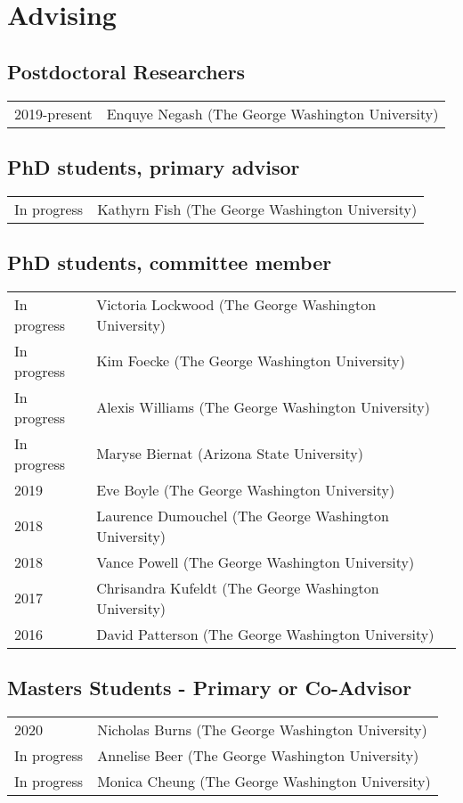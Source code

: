 \documentclass{article}
\begin{document}
\section*{Advising}
\subsection*{Postdoctoral Researchers}
\begin{tabular}{p{}p{}}
2019-present & Enquye Negash (The George Washington University)\\[4pt]
\end{tabular}

\subsection*{PhD students, primary advisor}
\begin{tabular}{p{}p{}}
In progress & Kathyrn Fish (The George Washington University)\\[4pt]
\end{tabular}

\subsection*{PhD students, committee member}
\begin{tabular}{p{}p{}}
In progress & Victoria Lockwood (The George Washington University)\\[4pt]
In progress & Kim Foecke (The George Washington University)\\[4pt]
In progress & Alexis Williams (The George Washington University)\\[4pt]
In progress & Maryse Biernat (Arizona State University)\\[4pt]
2019 & Eve Boyle (The George Washington University)\\[4pt]
2018 & Laurence Dumouchel (The George Washington University)\\[4pt]
2018 & Vance Powell (The George Washington University)\\[4pt]
2017 & Chrisandra Kufeldt (The George Washington University)\\[4pt]
2016 & David Patterson (The George Washington University)\\

\end{tabular}

\subsection*{Masters Students - Primary or Co-Advisor}
\begin{tabular}{p{}p{}}
2020 & Nicholas Burns (The George Washington University)\\[4pt]
In progress & Annelise Beer (The George Washington University)\\[4pt]
In progress & Monica Cheung (The George Washington University)\\[4pt]
\end{tabular}
\end{document}
